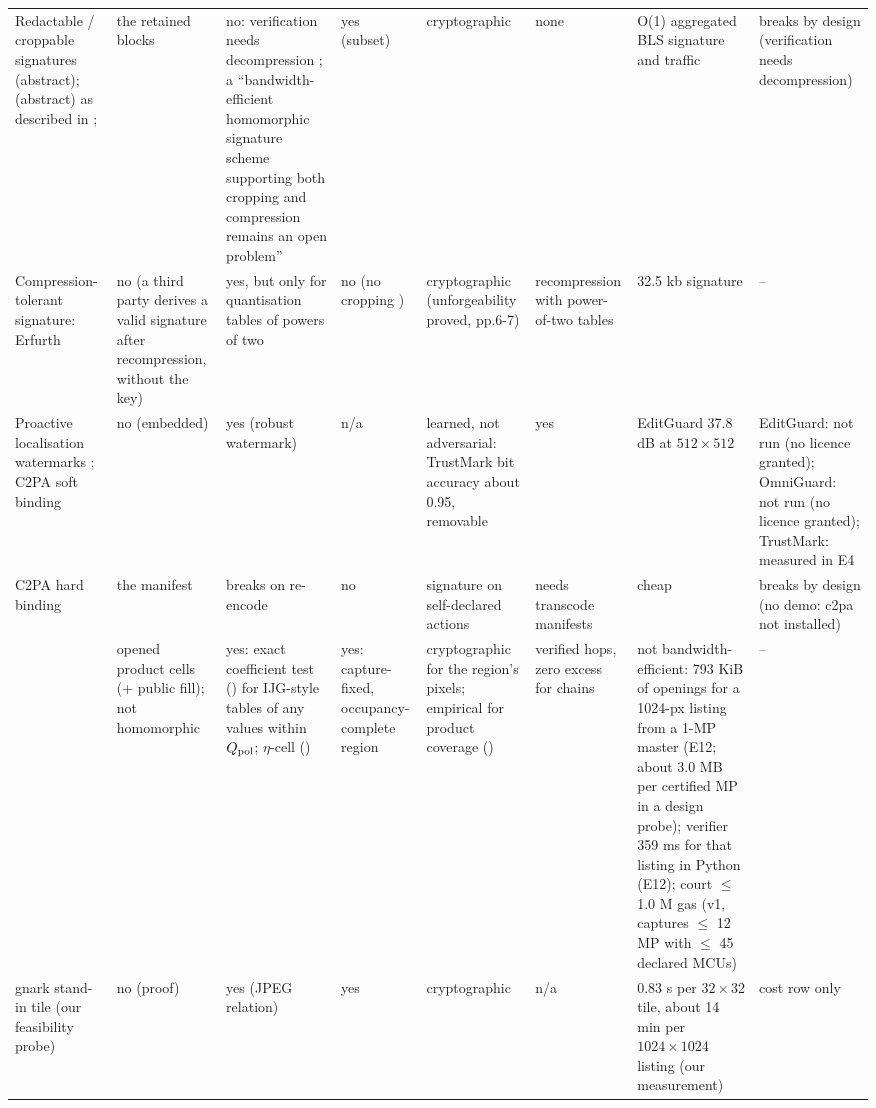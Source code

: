 \documentclass[10pt]{article}
\begin{document}
\begin{landscape}
{\begin{longtable}{@{}L{2.9cm}L{2.2cm}L{2.5cm}L{1.9cm}L{3.2cm}L{1.9cm}L{5.0cm}L{2.2cm}@{}}
Redactable / croppable signatures \cite{steinfeld2002content} (abstract); \cite{johnson2002homomorphic} (abstract) as described in \cite[p.2]{perazzo2025jpegs}; \cite{perazzo2025jpegs} & the retained blocks & no: verification needs decompression \cite[p.3]{perazzo2025jpegs}; a ``bandwidth-efficient homomorphic signature scheme supporting both cropping and compression remains an open problem'' \cite[p.2]{perazzo2025jpegs} & yes (subset) & cryptographic & none & O(1) aggregated BLS signature and traffic \cite[pp.1-2]{perazzo2025jpegs} & breaks by design (verification needs decompression)\\ \addlinespace[3pt]
Compression-tolerant signature: Erfurth \cite{erfurth2024digital} & no (a third party derives a valid signature after recompression, without the key) & yes, but only for quantisation tables of powers of two \cite[p.1]{erfurth2024digital} & no (no cropping \cite[p.2]{perazzo2025jpegs}) & cryptographic (unforgeability proved, pp.6-7) & recompression with power-of-two tables & 32.5 kb signature \cite[p.9]{erfurth2024digital} & --\\ \addlinespace[3pt]
Proactive localisation watermarks \cite{zhang2024editguard,zhang2025omniguard}; C2PA soft binding \cite{bui2025trustmark} & no (embedded) & yes (robust watermark) & n/a & learned, not adversarial: TrustMark bit accuracy about 0.95, removable \cite[p.8, pp.1, 4]{bui2025trustmark} & yes & EditGuard 37.8 dB at $512\times512$ \cite[Table 2 p.6]{zhang2024editguard} & EditGuard: not run (no licence granted); OmniGuard: not run (no licence granted); TrustMark: measured in E4\\ \addlinespace[3pt]
C2PA hard binding \cite{cfcpaa2026content} & the manifest & breaks on re-encode & no & signature on self-declared actions \cite[pp.188-191]{cfcpaa2026content} & needs transcode manifests & cheap & breaks by design (no demo: c2pa not installed)\\ \addlinespace[3pt]
\textbf{\sys{}} & opened product cells (+ public fill); not homomorphic & yes: exact coefficient test (\Ezero{}) for IJG-style tables of any values within $Q_{\mathrm{pol}}$; $\eta$-cell (\Eone{}) & yes: capture-fixed, occupancy-complete region & cryptographic for the region's pixels; empirical for product coverage () & verified hops, zero excess for \Ezero{} chains & not bandwidth-efficient: 793 KiB of openings for a 1024-px listing from a 1-MP master (E12; about 3.0 MB per certified MP in a design probe); \Ezero{} verifier 359 ms for that listing in Python (E12); court $\le$ 1.0 M gas (v1, captures $\le$ 12 MP with $\le$ 45 declared MCUs) & --\\ \addlinespace[3pt]
gnark stand-in tile (our feasibility probe) & no (proof) & yes (JPEG relation) & yes & cryptographic & n/a & 0.83 s per $32\times32$ tile, about 14 min per $1024\times1024$ listing (our measurement) & cost row only\\
\end{longtable}}
\end{landscape}
\end{document}
